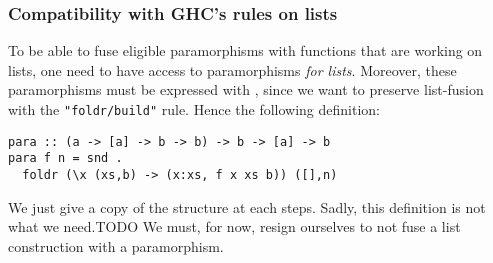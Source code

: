 \subsubsection{Compatibility with GHC's rules on lists}
\label{sec:parabuild}
To be able to fuse eligible paramorphisms with functions that are working on lists, one need to have access to paramorphisms \emph{for lists}. Moreover, these paramorphisms must be expressed with , since we want to preserve list-fusion with the \verb|"foldr/build"| rule. Hence the following definition:
\begin{verbatim}
para :: (a -> [a] -> b -> b) -> b -> [a] -> b
para f n = snd . 
  foldr (\x (xs,b) -> (x:xs, f x xs b)) ([],n)
\end{verbatim}
\noindent We just give a copy of the structure at each steps. Sadly, this definition is not what we need.TODO
We must, for now, resign ourselves to not fuse a list construction with a paramorphism.
